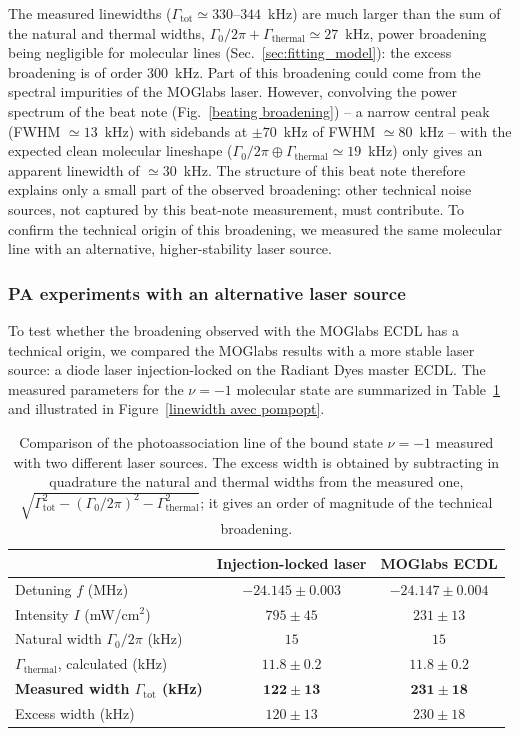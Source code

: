The measured linewidths ($\Gamma_{\text{tot}} \simeq 330\text{--}344$~kHz) are much larger
than the sum of the natural and thermal widths, $\Gamma_0/2\pi + \Gamma_{\text{thermal}} \simeq 27$~kHz,
power broadening being negligible for molecular lines (Sec.~\ref{sec:fitting_model}): the
excess broadening is of order $300$~kHz. Part of this broadening could come from the spectral
impurities of the MOGlabs laser. However, convolving the power spectrum of the beat note
(Fig.~\ref{beating broadening}) -- a narrow central peak (FWHM $\simeq 13$~kHz) with
sidebands at $\pm 70$~kHz of FWHM $\simeq 80$~kHz -- with the expected clean molecular lineshape
($\Gamma_0/2\pi \oplus \Gamma_{\text{thermal}} \simeq 19$~kHz) only gives an apparent linewidth of
$\simeq 30$~kHz. The structure of this beat note therefore explains only a small part of the
observed broadening: other technical noise sources, not captured by this beat-note
measurement, must contribute. To
confirm the technical origin of this broadening, we measured the same molecular line
with an alternative, higher-stability laser source.


\subsubsection{PA experiments with an alternative laser source}
To test whether the broadening observed with the MOGlabs ECDL has a technical origin, we compared the MOGlabs results with a more stable laser source: a diode laser
injection-locked on the Radiant Dyes master ECDL.
The measured parameters for the $\nu = -1$ molecular state are summarized in Table~\ref{tab:comparaison_lasers} and illustrated in Figure~\ref{linewidth avec pompopt}.

\begin{table}[ht]
\centering
\caption{Comparison of the photoassociation line of the bound state $\nu=-1$ measured with two different laser sources. The excess width is obtained by subtracting in quadrature the natural and thermal widths from the measured one, $\sqrt{\Gamma_{\text{tot}}^2-(\Gamma_0/2\pi)^2-\Gamma_{\text{thermal}}^2}$; it gives an order of magnitude of the technical broadening.}
\label{tab:comparaison_lasers}
\begin{tabular}{lcc}
\toprule
 & Injection-locked laser & MOGlabs ECDL \\
\midrule
Detuning $f$ (MHz) & $-24.145 \pm 0.003$ & $-24.147 \pm 0.004$ \\
Intensity $I$ (mW/cm$^2$) & $795\pm45$ & $231\pm13$ \\
Natural width $\Gamma_0/2\pi$ (kHz) & $15$ & $15$ \\
$\Gamma_{\text{thermal}}$, calculated (kHz) & $11.8\pm0.2$ & $11.8\pm0.2$ \\
\textbf{Measured width $\Gamma_{\text{tot}}$ (kHz)} & $\mathbf{122 \pm 13}$ & $\mathbf{231 \pm 18}$ \\
Excess width (kHz) & $120 \pm 13$ & $230 \pm 18$ \\
\bottomrule
\end{tabular}
\end{table}

